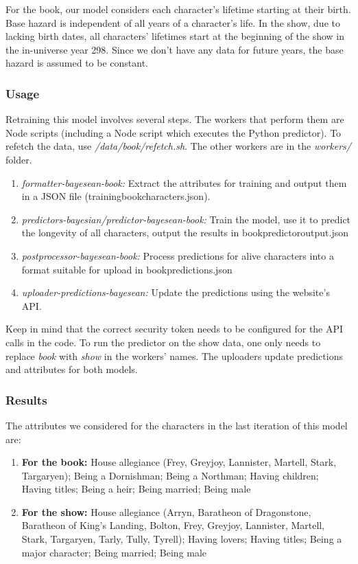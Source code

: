 \documentclass{bioinfo}
\begin{document}
For the book, our model considers each character's lifetime starting at their birth. Base hazard is independent of all years of a character's life. In the show, due to lacking birth dates, all characters' lifetimes start at the beginning of the show in the in-universe year 298. Since we don't have any data for future years, the base hazard is assumed to be constant.

\subsubsection{Usage}
Retraining this model involves several steps. The workers that perform them are Node scripts (including a Node script which executes the Python predictor). To refetch the data, use \textit{/data/book/refetch.sh}. The other workers are in the \textit{workers/} folder.

\begin{enumerate}
    \item \textit{formatter-bayesean-book:} Extract the attributes for training and output them in a JSON file (training{\textunderscore}book{\textunderscore}characters.json).
    \item \textit{predictors-bayesian/predictor-bayesean-book:} Train the model, use it to predict the longevity of all characters, output the results in book{\textunderscore}predictor{\textunderscore}output.json
    \item \textit{postprocessor-bayesean-book:} Process predictions for alive characters into a format suitable for upload in book{\textunderscore}predictions.json
    \item \textit{uploader-predictions-bayesean:} Update the predictions using the website's API.
\end{enumerate}

Keep in mind that the correct security token needs to be configured for the API calls in the code. To run the predictor on the show data, one only needs to replace \textit{book} with \textit{show} in the workers' names. The uploaders update predictions and attributes for both models.

\subsubsection{Results}
The attributes we considered for the characters in the last iteration of this model are:
\begin{enumerate}
    \item \textbf{For the book:} House allegiance (Frey, Greyjoy, Lannister, Martell, Stark, Targaryen); Being a Dornishman; Being a Northman; Having children; Having titles; Being a heir; Being married; Being male
    \item \textbf{For the show:} House allegiance (Arryn, Baratheon of Dragonstone, Baratheon of King{'}s Landing, Bolton, Frey, Greyjoy, Lannister, Martell, Stark, Targaryen, Tarly, Tully, Tyrell); Having lovers; Having titles; Being a major character; Being married; Being male
\end{enumerate}
\end{document}
